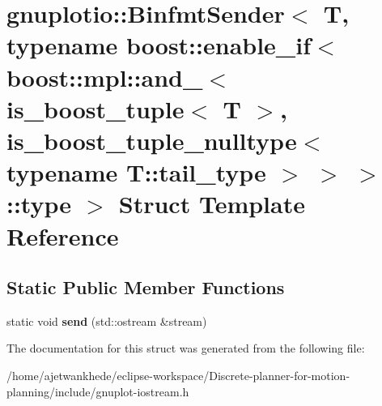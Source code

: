 \hypertarget{structgnuplotio_1_1BinfmtSender_3_01T_00_01typename_01boost_1_1enable__if_3_01boost_1_1mpl_1_1an36b5089f0cb57748545b30004479b7ea}{}\section{gnuplotio\+:\+:Binfmt\+Sender$<$ T, typename boost\+:\+:enable\+\_\+if$<$ boost\+:\+:mpl\+:\+:and\+\_\+$<$ is\+\_\+boost\+\_\+tuple$<$ T $>$, is\+\_\+boost\+\_\+tuple\+\_\+nulltype$<$ typename T\+:\+:tail\+\_\+type $>$ $>$ $>$\+:\+:type $>$ Struct Template Reference}
\label{structgnuplotio_1_1BinfmtSender_3_01T_00_01typename_01boost_1_1enable__if_3_01boost_1_1mpl_1_1an36b5089f0cb57748545b30004479b7ea}
\subsection*{Static Public Member Functions}
\begin{DoxyCompactItemize}
\item 
\mbox{\label{structgnuplotio_1_1BinfmtSender_3_01T_00_01typename_01boost_1_1enable__if_3_01boost_1_1mpl_1_1an36b5089f0cb57748545b30004479b7ea_aa1850ae529cdb36fedc67c5ebfa3f871}} 
static void {\bfseries send} (std\+::ostream \&stream)
\end{DoxyCompactItemize}


The documentation for this struct was generated from the following file\+:\begin{DoxyCompactItemize}
\item 
/home/ajetwankhede/eclipse-\/workspace/\+Discrete-\/planner-\/for-\/motion-\/planning/include/gnuplot-\/iostream.\+h\end{DoxyCompactItemize}
